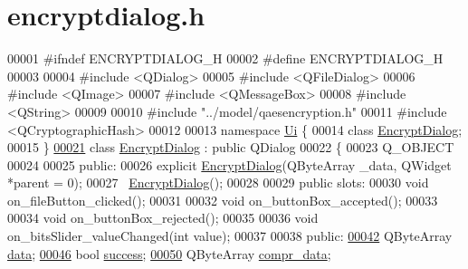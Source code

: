 \hypertarget{encryptdialog_8h_source}{}\section{encryptdialog.\+h}
\label{encryptdialog_8h_source}

\begin{DoxyCode}
00001 \textcolor{preprocessor}{#ifndef ENCRYPTDIALOG\_H}
00002 \textcolor{preprocessor}{#define ENCRYPTDIALOG\_H}
00003 
00004 \textcolor{preprocessor}{#include <QDialog>}
00005 \textcolor{preprocessor}{#include <QFileDialog>}
00006 \textcolor{preprocessor}{#include <QImage>}
00007 \textcolor{preprocessor}{#include <QMessageBox>}
00008 \textcolor{preprocessor}{#include <QString>}
00009 
00010 \textcolor{preprocessor}{#include "../model/qaesencryption.h"}
00011 \textcolor{preprocessor}{#include <QCryptographicHash>}
00012 
00013 \textcolor{keyword}{namespace }\hyperlink{namespace_ui}{Ui} \{
00014 \textcolor{keyword}{class }\hyperlink{class_encrypt_dialog}{EncryptDialog};
00015 \}
\hypertarget{encryptdialog_8h_source.tex_l00021}{}\hyperlink{class_encrypt_dialog}{00021} \textcolor{keyword}{class }\hyperlink{class_encrypt_dialog}{EncryptDialog} : \textcolor{keyword}{public} QDialog
00022 \{
00023     Q\_OBJECT
00024 
00025 \textcolor{keyword}{public}:
00026     \textcolor{keyword}{explicit} \hyperlink{class_encrypt_dialog}{EncryptDialog}(QByteArray \_data, QWidget *parent = 0);
00027     ~\hyperlink{class_encrypt_dialog}{EncryptDialog}();
00028 
00029 \textcolor{keyword}{public} slots:
00030     \textcolor{keywordtype}{void} on\_fileButton\_clicked();
00031 
00032     \textcolor{keywordtype}{void} on\_buttonBox\_accepted();
00033 
00034     \textcolor{keywordtype}{void} on\_buttonBox\_rejected();
00035 
00036     \textcolor{keywordtype}{void} on\_bitsSlider\_valueChanged(\textcolor{keywordtype}{int} value);
00037 
00038 \textcolor{keyword}{public}:
\hypertarget{encryptdialog_8h_source.tex_l00042}{}\hyperlink{class_encrypt_dialog_acf3a8bbce90d99ef17fec093c35b1008}{00042}     QByteArray \hyperlink{class_encrypt_dialog_acf3a8bbce90d99ef17fec093c35b1008}{data};
\hypertarget{encryptdialog_8h_source.tex_l00046}{}\hyperlink{class_encrypt_dialog_ada4900bcd40894d9c098c65aa4066ac9}{00046}     \textcolor{keywordtype}{bool} \hyperlink{class_encrypt_dialog_ada4900bcd40894d9c098c65aa4066ac9}{success};
\hypertarget{encryptdialog_8h_source.tex_l00050}{}\hyperlink{class_encrypt_dialog_a3e8998aa39696cbd1242f6420ef18143}{00050}     QByteArray \hyperlink{class_encrypt_dialog_a3e8998aa39696cbd1242f6420ef18143}{compr\_data};

\end{DoxyCode}
